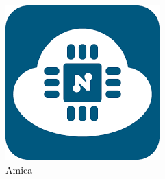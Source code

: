 \documentclass{beamer}
\begin{document}
\begin{frame}
\begin{minipage}{\textwidth}
	\begin{figure}
		\centering
		\begin{subfigure}[b]{0.25\textwidth}
			\includegraphics[width=\textwidth]{AmicaLogo.png}
			\caption{Amica}
			\label{fig:arudino_unsdfo}
		\end{subfigure}
		~ %
		\begin{subfigure}[b]{0.2\textwidth}

\end{subfigure}
\end{figure}
\end{minipage}
\end{frame}
\end{document}
